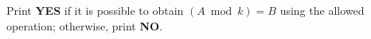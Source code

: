 Print \textbf{YES} if it is possible to obtain $(A \bmod k) = B$ using the allowed operation; otherwise, print \textbf{NO}.